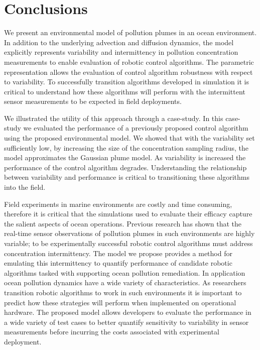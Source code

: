 \documentclass[ letterpaper, 10 pt, conference]{ieeeconf}  %
\begin{document}


\section{Conclusions}\label{part:conclusion}
We present an environmental model of pollution plumes in an ocean environment.  In addition to the underlying advection and diffusion dynamics, the model explicitly represents variability and intermittency in pollution concentration measurements to enable evaluation of robotic control algorithms.  The parametric representation allows the evaluation of control algorithm robustness with respect to variability.  To successfully transition algorithms developed in simulation it is critical to understand how these algorithms will perform with the intermittent sensor measurements to be expected in field deployments.
 
We illustrated the utility of this approach through a case-study.  In this case-study we evaluated the performance of a previously proposed control algorithm using the proposed environmental model.  We showed that with the variability set sufficiently low, by increasing the size of the concentration sampling radius, the model approximates the Gaussian plume model.  As variability is increased the performance of the control algorithm degrades.  Understanding the relationship between variability and performance is critical to transitioning these algorithms into the field.

Field experiments in marine environments are costly and time consuming, therefore it is critical that the simulations used to evaluate their efficacy capture the salient aspects of ocean operations.  Previous research has shown that the real-time sensor observations of pollution plumes in such environments are highly variable; to be experimentally successful robotic control algorithms must address concentration intermittency. The model we propose provides a method for emulating this intermittency to quantify performance of candidate robotic algorithms tasked with supporting ocean pollution remediation.  In application ocean pollution dynamics have a wide variety of characteristics.  As researchers transition robotic algorithms to work in such environments it is important to predict how these strategies will perform when implemented on operational hardware.  The proposed model allows developers to evaluate the performance in a wide variety of test cases to better quantify sensitivity to variability in sensor measurements before incurring the costs associated with experimental deployment.
\end{document}

